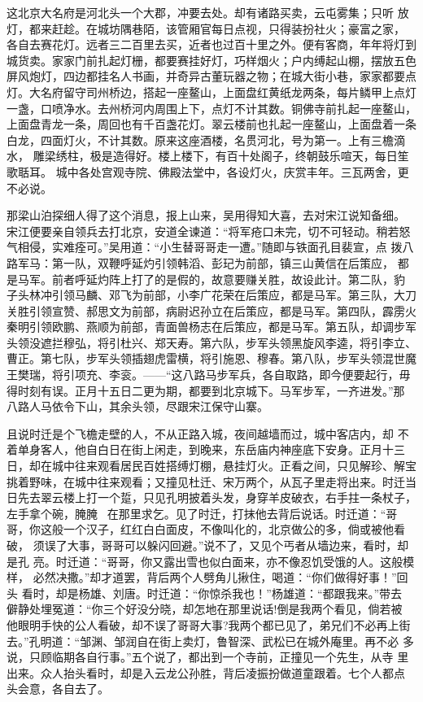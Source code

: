 这北京大名府是河北头一个大郡，冲要去处。却有诸路买卖，云屯雾集；只听
放灯，都来赶趁。在城坊隅巷陌，该管厢官每日点视，只得装扮社火；豪富之家，
各自去赛花灯。远者三二百里去买，近者也过百十里之外。便有客商，年年将灯到
城货卖。家家门前扎起灯栅，都要赛挂好灯，巧样烟火；户内缚起山棚，摆放五色
屏风炮灯，四边都挂名人书画，并奇异古董玩器之物；在城大街小巷，家家都要点
灯。大名府留守司州桥边，搭起一座鳌山，上面盘红黄纸龙两条，每片鳞甲上点灯
一盏，口喷净水。去州桥河内周围上下，点灯不计其数。铜佛寺前扎起一座鳌山，
上面盘青龙一条，周回也有千百盏花灯。翠云楼前也扎起一座鳌山，上面盘着一条
白龙，四面灯火，不计其数。原来这座酒楼，名贯河北，号为第一。上有三檐滴水，
雕梁绣柱，极是造得好。楼上楼下，有百十处阁子，终朝鼓乐喧天，每日笙歌聒耳。
城中各处宫观寺院、佛殿法堂中，各设灯火，庆赏丰年。三瓦两舍，更不必说。

那梁山泊探细人得了这个消息，报上山来，吴用得知大喜，去对宋江说知备细。
宋江便要亲自领兵去打北京，安道全谏道：“将军疮口未完，切不可轻动。稍若怒
气相侵，实难痊可。”吴用道：“小生替哥哥走一遭。”随即与铁面孔目裴宣，点
拨八路军马：第一队，双鞭呼延灼引领韩滔、彭玘为前部，镇三山黄信在后策应，
都是马军。前者呼延灼阵上打了的是假的，故意要赚关胜，故设此计。第二队，豹
子头林冲引领马麟、邓飞为前部，小李广花荣在后策应，都是马军。第三队，大刀
关胜引领宣赞、郝思文为前部，病尉迟孙立在后策应，都是马军。第四队，霹雳火
秦明引领欧鹏、燕顺为前部，青面兽杨志在后策应，都是马军。第五队，却调步军
头领没遮拦穆弘，将引杜兴、郑天寿。第六队，步军头领黑旋风李逵，将引李立、
曹正。第七队，步军头领插翅虎雷横，将引施恩、穆春。第八队，步军头领混世魔
王樊瑞，将引项充、李衮。——“这八路马步军兵，各自取路，即今便要起行，毋
得时刻有误。正月十五日二更为期，都要到北京城下。马军步军，一齐进发。”那
八路人马依令下山，其余头领，尽跟宋江保守山寨。

且说时迁是个飞檐走壁的人，不从正路入城，夜间越墙而过，城中客店内，却
不着单身客人，他自白日在街上闲走，到晚来，东岳庙内神座底下安身。正月十三
日，却在城中往来观看居民百姓搭缚灯棚，悬挂灯火。正看之间，只见解珍、解宝
挑着野味，在城中往来观看；又撞见杜迁、宋万两个，从瓦子里走将出来。时迁当
日先去翠云楼上打一个踅，只见孔明披着头发，身穿羊皮破衣，右手拄一条杖子，
左手拿个碗，腌腌，在那里求乞。见了时迁，打抹他去背后说话。时迁道：“哥
哥，你这般一个汉子，红红白白面皮，不像叫化的，北京做公的多，倘或被他看破，
须误了大事，哥哥可以躲闪回避。”说不了，又见个丐者从墙边来，看时，却是孔
亮。时迁道：“哥哥，你又露出雪也似白面来，亦不像忍饥受饿的人。这般模样，
必然决撒。”却才道罢，背后两个人劈角儿揪住，喝道：“你们做得好事！”回头
看时，却是杨雄、刘唐。时迁道：“你惊杀我也！”杨雄道：“都跟我来。”带去
僻静处埋冤道：“你三个好没分晓，却怎地在那里说话!倒是我两个看见，倘若被
他眼明手快的公人看破，却不误了哥哥大事?我两个都已见了，弟兄们不必再上街
去。”孔明道：“邹渊、邹润自在街上卖灯，鲁智深、武松已在城外庵里。再不必
多说，只顾临期各自行事。”五个说了，都出到一个寺前，正撞见一个先生，从寺
里出来。众人抬头看时，却是入云龙公孙胜，背后凌振扮做道童跟着。七个人都点
头会意，各自去了。

